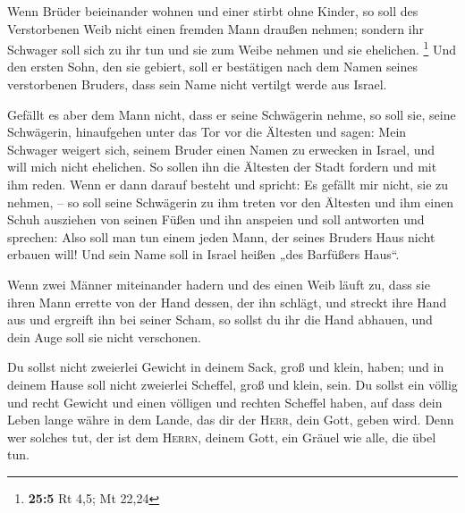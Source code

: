  Wenn Brüder beieinander wohnen und einer stirbt ohne
Kinder, so soll des Verstorbenen Weib nicht einen fremden Mann draußen
nehmen; sondern ihr Schwager soll sich zu ihr tun und sie zum Weibe
nehmen und sie ehelichen. \footnote{\textbf{25:5} Rt 4,5; Mt 22,24}
 Und den ersten Sohn, den sie gebiert, soll er bestätigen
nach dem Namen seines verstorbenen Bruders, dass sein Name nicht
vertilgt werde aus Israel.

 Gefällt es aber dem Mann nicht, dass er seine Schwägerin
nehme, so soll sie, seine Schwägerin, hinaufgehen unter das Tor vor die
Ältesten und sagen: Mein Schwager weigert sich, seinem Bruder einen
Namen zu erwecken in Israel, und will mich nicht ehelichen.
 So sollen ihn die Ältesten der Stadt fordern und mit ihm
reden. Wenn er dann darauf besteht und spricht: Es gefällt mir nicht,
sie zu nehmen, --  so soll seine Schwägerin zu ihm treten
vor den Ältesten und ihm einen Schuh ausziehen von seinen Füßen und ihn
anspeien und soll antworten und sprechen: Also soll man tun einem jeden
Mann, der seines Bruders Haus nicht erbauen will!  Und
sein Name soll in Israel heißen „des Barfüßers Haus``.

 Wenn zwei Männer miteinander hadern und des einen Weib
läuft zu, dass sie ihren Mann errette von der Hand dessen, der ihn
schlägt, und streckt ihre Hand aus und ergreift ihn bei seiner Scham,
 so sollst du ihr die Hand abhauen, und dein Auge soll
sie nicht verschonen.

 Du sollst nicht zweierlei Gewicht in deinem Sack, groß
und klein, haben;  und in deinem Hause soll nicht
zweierlei Scheffel, groß und klein, sein.  Du sollst ein
völlig und recht Gewicht und einen völligen und rechten Scheffel haben,
auf dass dein Leben lange währe in dem Lande, das dir der \textsc{Herr},
dein Gott, geben wird.  Denn wer solches tut, der ist dem
\textsc{Herrn}, deinem Gott, ein Gräuel wie alle, die übel tun.

